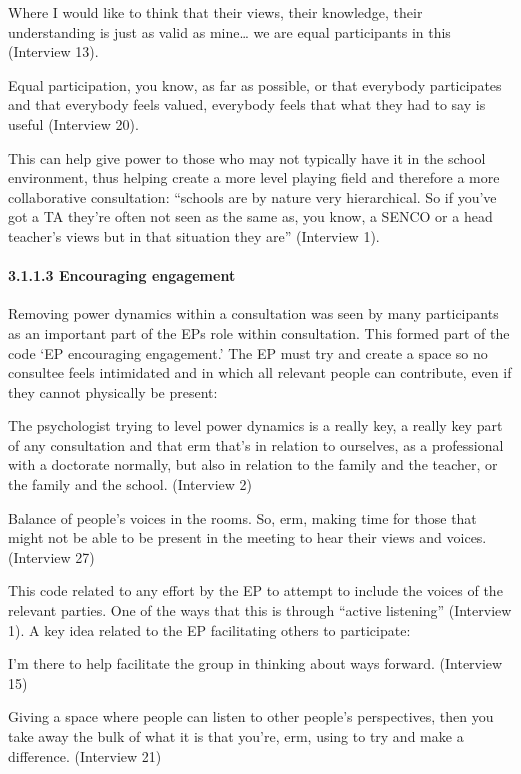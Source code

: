 \documentclass[
]{article}
\begin{document}
Where I would like to think that their views, their knowledge, their
understanding is just as valid as mine\ldots{} we are equal participants
in this (Interview 13).

Equal participation, you know, as far as possible, or that everybody
participates and that everybody feels valued, everybody feels that what
they had to say is useful (Interview 20).

This can help give power to those who may not typically have it in the
school environment, thus helping create a more level playing field and
therefore a more collaborative consultation: ``schools are by nature
very hierarchical. So if you've got a TA they're often not seen as the
same as, you know, a SENCO or a head teacher's views but in that
situation they are'' (Interview 1).

\hypertarget{encouraging-engagement}{%
\paragraph{3.1.1.3 Encouraging
engagement}\label{encouraging-engagement}}

Removing power dynamics within a consultation was seen by many
participants as an important part of the EPs role within consultation.
This formed part of the code `EP encouraging engagement.' The EP must
try and create a space so no consultee feels intimidated and in which
all relevant people can contribute, even if they cannot physically be
present:

The psychologist trying to level power dynamics is a really key, a
really key part of any consultation and that erm that's in relation to
ourselves, as a professional with a doctorate normally, but also in
relation to the family and the teacher, or the family and the school.
(Interview 2)

Balance of people's voices in the rooms. So, erm, making time for those
that might not be able to be present in the meeting to hear their views
and voices. (Interview 27)

This code related to any effort by the EP to attempt to include the
voices of the relevant parties. One of the ways that this is through
``active listening'' (Interview 1). A key idea related to the EP
facilitating others to participate:

I'm there to help facilitate the group in thinking about ways forward.
(Interview 15)

Giving a space where people can listen to other people's perspectives,
then you take away the bulk of what it is that you're, erm, using to try
and make a difference. (Interview 21)
\end{document}

